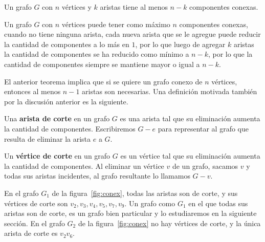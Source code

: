 \begin{teorema}\label{teo:min-components}
Un grafo $G$ con $n$ vértices y $k$ aristas tiene al menos $n-k$ componentes conexas.

\begin{demostracion}
Un grafo $G$ con $n$ vértices puede tener como máximo $n$ componentes conexas, cuando no tiene ninguna arista, cada nueva arista que se le agregue puede reducir la cantidad de componentes a lo más en $1$, por lo que luego de agregar $k$ aristas la cantidad de componentes se ha reducido como mínimo a $n-k$, por lo que la cantidad de componentes siempre se mantiene mayor o igual a $n-k$.
\end{demostracion}
\end{teorema}

El anterior teorema implica que si se quiere un grafo conexo de $n$ vértices, entonces al menos $n-1$ aristas son necesarias.
Una definición motivada también por la discusión anterior es la siguiente.

\begin{definicion}
Una {\bf arista de corte} en un grafo $G$ es una arista tal que su eliminación aumenta la cantidad de componentes.
Escribiremos $G-e$ para representar al grafo que resulta de eliminar la arista $e$ a $G$.

Un {\bf vértice de corte} en un grafo $G$ es un vértice tal que su eliminación aumenta la cantidad de componentes. 
Al eliminar un vértice $v$ de un grafo, sacamos $v$ y todas sus aristas incidentes, al grafo resultante lo llamamos $G-v$.
\end{definicion}

\begin{ejemplo}
En el grafo $G_1$ de la figura~\ref{fig:conex}, todas las aristas son de corte, y sus vértices de corte son $v_2,v_3,v_4,v_5,v_7,v_9$.
Un grafo como $G_1$ en el que todas sus aristas son de corte, es un grafo bien particular y lo estudiaremos en la siguiente sección.
En el grafo $G_2$ de la figura~\ref{fig:conex} no hay vértices de corte, y la única arista de corte es $v_2v_6$.
\end{ejemplo}

